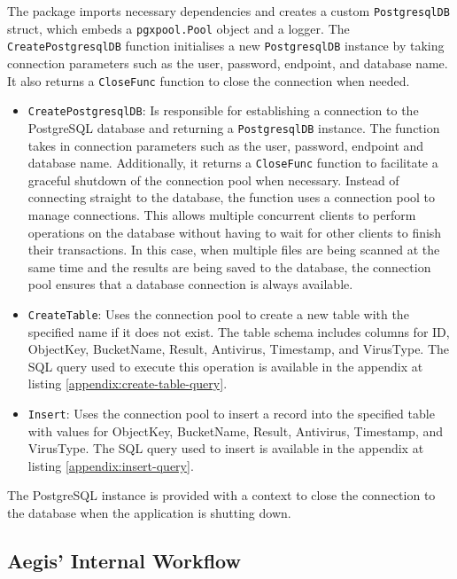 \documentclass[12pt, conference, final, a4paper, onecolumn, compsoc]{IEEEtran}
\begin{document}
The package imports necessary dependencies and creates a custom
\texttt{PostgresqlDB} struct, which embeds a \texttt{pgxpool.Pool} object and a
logger. The \texttt{CreatePostgresqlDB} function initialises a new
\texttt{PostgresqlDB} instance by taking connection parameters such as the user,
password, endpoint, and database name. It also returns a \texttt{CloseFunc}
function to close the connection when needed.

\begin{itemize}
  \item \texttt{CreatePostgresqlDB}: Is responsible for establishing a
        connection to the PostgreSQL database and returning a
        \texttt{PostgresqlDB} instance. The function takes in connection
        parameters such as the user, password, endpoint and database name.
        Additionally, it returns a \texttt{CloseFunc} function to facilitate a
        graceful shutdown of the connection pool when necessary. Instead of
        connecting straight to the database, the function uses a connection pool
        to manage connections. This allows multiple concurrent clients to
        perform operations on the database without having to wait for other
        clients to finish their transactions. In this case, when multiple files
        are being scanned at the same time and the results are being saved to
        the database, the connection pool ensures that a database connection is
        always available.
  \item \texttt{CreateTable}: Uses the connection pool to create a new table
        with the specified name if it does not exist. The table schema includes
        columns for ID, ObjectKey, BucketName, Result, Antivirus, Timestamp, and
        VirusType. The SQL query used to execute this operation is available in
        the appendix at listing \ref{appendix:create-table-query}.
  \item \texttt{Insert}: Uses the connection pool to insert a record into the
        specified table with values for ObjectKey, BucketName, Result,
        Antivirus, Timestamp, and VirusType. The SQL query used to insert is
        available in the appendix at listing \ref{appendix:insert-query}.
\end{itemize}

The PostgreSQL instance is provided with a context to close the connection to
the database when the application is shutting down.

\subsection{Aegis' Internal Workflow}
\end{document}

